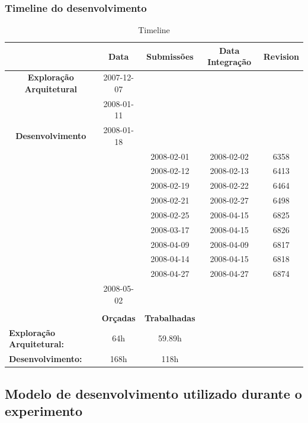 \subsubsection{Timeline do desenvolvimento}
\begin{table}[htbp]
\begin{tabular}{|l|c|c|c|c|}
\hline
 & \textbf{Data} & \textbf{Submissões} & \textbf{Data Integração} & \textbf{Revision} \\ \hline
\multicolumn{ 1}{|c|}{\textbf{Exploração Arquitetural}} & 2007-12-07 &  &  &  \\ \cline{ 2- 5}
\multicolumn{ 1}{|l|}{} & 2008-01-11 &  &  &  \\ \hline
\multicolumn{ 1}{|c|}{\textbf{Desenvolvimento}} & 2008-01-18 &  &  &  \\ \cline{ 2- 5}
\multicolumn{ 1}{|l|}{} &  & 2008-02-01 & 2008-02-02 & 6358 \\ \cline{ 2- 5}
\multicolumn{ 1}{|l|}{} &  & 2008-02-12 & 2008-02-13 & 6413 \\ \cline{ 2- 5}
\multicolumn{ 1}{|l|}{} &  & 2008-02-19 & 2008-02-22 & 6464 \\ \cline{ 2- 5}
\multicolumn{ 1}{|l|}{} &  & 2008-02-21 & 2008-02-27 & 6498 \\ \cline{ 2- 5}
\multicolumn{ 1}{|l|}{} &  & 2008-02-25 & 2008-04-15 & 6825 \\ \cline{ 2- 5}
\multicolumn{ 1}{|l|}{} &  & 2008-03-17 & 2008-04-15 & 6826 \\ \cline{ 2- 5}
\multicolumn{ 1}{|l|}{} &  & 2008-04-09 & 2008-04-09 & 6817 \\ \cline{ 2- 5}
\multicolumn{ 1}{|l|}{} &  & 2008-04-14 & 2008-04-15 & 6818 \\ \cline{ 2- 5}
\multicolumn{ 1}{|l|}{} &  & 2008-04-27 & 2008-04-27 & 6874 \\ \cline{ 2- 5}
\multicolumn{ 1}{|l|}{} & 2008-05-02 &  &  &  \\ \hline
 &  &  &  &  \\ \hline
 & \textbf{Orçadas} & \textbf{Trabalhadas} &  &  \\ \hline
\textbf{Exploração Arquitetural:} & 64h & 59.89h &  &  \\ \hline
\textbf{Desenvolvimento:} & 168h & 118h &  &  \\ \hline
\end{tabular}
\caption{Timeline}
\label{Timeline}
\end{table}

\subsection{Modelo de desenvolvimento utilizado durante o experimento} 

